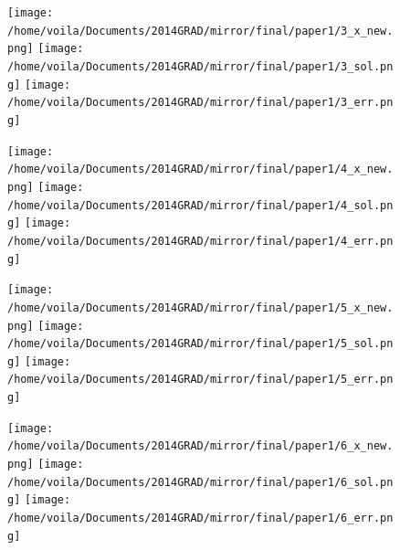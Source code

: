 \documentclass[a4paper,onecolumn]{article}
\theoremstyle{remark}
\begin{document}
\vspace{-1cm}
\begin{figure}[H]\begin{center}
    \texttt{[image: /home/voila/Documents/2014GRAD/mirror/final/paper1/3\_x\_new.png]}
    \texttt{[image: /home/voila/Documents/2014GRAD/mirror/final/paper1/3\_sol.png]}
    \texttt{[image: /home/voila/Documents/2014GRAD/mirror/final/paper1/3\_err.png]}
    \label{fig:sol compare}
\end{center}\end{figure}
\vspace{-1cm}
\begin{figure}[H]\begin{center}
    \texttt{[image: /home/voila/Documents/2014GRAD/mirror/final/paper1/4\_x\_new.png]}
    \texttt{[image: /home/voila/Documents/2014GRAD/mirror/final/paper1/4\_sol.png]}
    \texttt{[image: /home/voila/Documents/2014GRAD/mirror/final/paper1/4\_err.png]}
    \label{fig:sol compare}
\end{center}\end{figure}
\vspace{-1cm}
\begin{figure}[H]\begin{center}
    \texttt{[image: /home/voila/Documents/2014GRAD/mirror/final/paper1/5\_x\_new.png]}
    \texttt{[image: /home/voila/Documents/2014GRAD/mirror/final/paper1/5\_sol.png]}
    \texttt{[image: /home/voila/Documents/2014GRAD/mirror/final/paper1/5\_err.png]}
    \label{fig:sol compare}
\end{center}\end{figure}
\vspace{-1cm}
\begin{figure}[H]\begin{center}
    \texttt{[image: /home/voila/Documents/2014GRAD/mirror/final/paper1/6\_x\_new.png]}
    \texttt{[image: /home/voila/Documents/2014GRAD/mirror/final/paper1/6\_sol.png]}
    \texttt{[image: /home/voila/Documents/2014GRAD/mirror/final/paper1/6\_err.png]}
    \label{fig:sol compare}
\end{center}\end{figure}
\vspace{-1cm}
\end{document}
